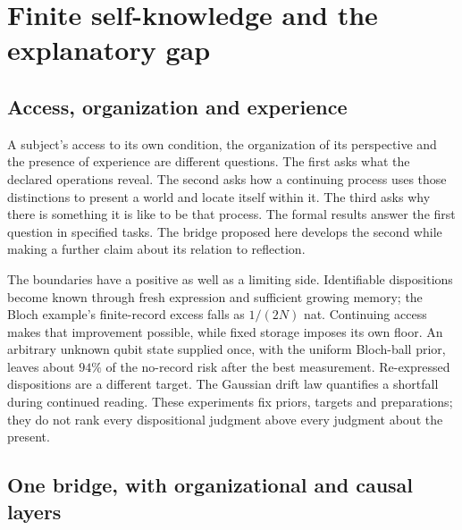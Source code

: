 \documentclass[12pt]{article}
\theoremstyle{definition}
\theoremstyle{remark}
\begin{document}
\section{Finite self-knowledge and the explanatory gap}\label{sec:bridge}

\subsection{Access, organization and experience}

A subject's access to its own condition, the organization of its
perspective and the presence of experience are different questions.
The first asks what the declared operations reveal. The second asks
how a continuing process uses those distinctions to present a world
and locate itself within it. The third asks why there is something
it is like to be that process. The formal results answer the first
question in specified tasks. The bridge proposed here develops the
second while making a further claim about its relation to reflection.

The boundaries have a positive as well as a limiting side.
Identifiable dispositions become known through fresh expression and
sufficient growing memory; the Bloch example's finite-record excess
falls as $1/(2N)$ nat. Continuing access makes that improvement possible,
while fixed storage imposes its own floor.
An arbitrary unknown qubit state supplied once, with the uniform
Bloch-ball prior, leaves about $94\%$ of the no-record risk after the
best measurement. Re-expressed dispositions are a different target.
The Gaussian drift law quantifies a shortfall during continued reading.
These experiments fix priors, targets and preparations; they do not
rank every dispositional judgment above every judgment about the present.

\subsection{One bridge, with organizational and causal layers}
\end{document}

